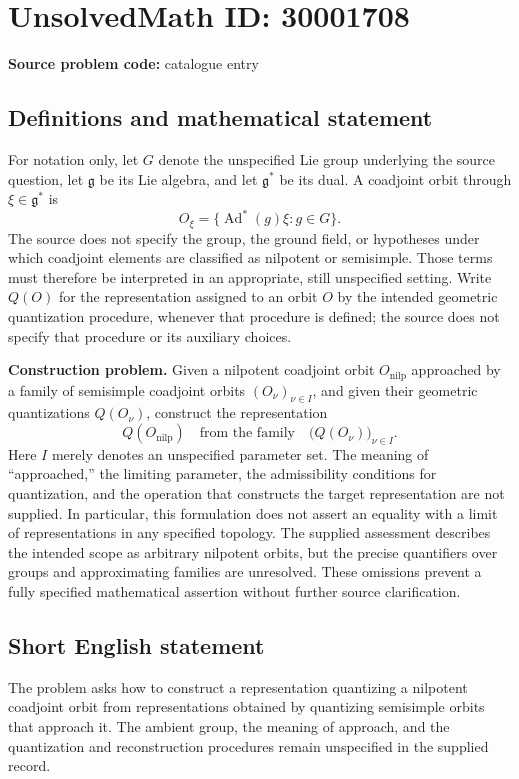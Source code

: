 \documentclass[11pt]{article}
\begin{document}
\section*{UnsolvedMath ID: 30001708}
\textbf{Source problem code:} catalogue entry
\subsection{Definitions and mathematical statement}
For notation only, let \(G\) denote the unspecified Lie group underlying the source question, let \(\mathfrak g\) be its Lie algebra, and let \(\mathfrak g^*\) be its dual. A coadjoint orbit through \(\xi\in\mathfrak g^*\) is
\[
O_\xi=\{\operatorname{Ad}^*(g)\xi:g\in G\}.
\]
The source does not specify the group, the ground field, or hypotheses under which coadjoint elements are classified as nilpotent or semisimple. Those terms must therefore be interpreted in an appropriate, still unspecified setting. Write \(Q(O)\) for the representation assigned to an orbit \(O\) by the intended geometric quantization procedure, whenever that procedure is defined; the source does not specify that procedure or its auxiliary choices.

\textbf{Construction problem.} Given a nilpotent coadjoint orbit \(O_{\mathrm{nilp}}\) approached by a family of semisimple coadjoint orbits \((O_\nu)_{\nu\in I}\), and given their geometric quantizations \(Q(O_\nu)\), construct the representation
\[
Q(O_{\mathrm{nilp}})
\quad\text{from the family}\quad
\bigl(Q(O_\nu)\bigr)_{\nu\in I}.
\]
Here \(I\) merely denotes an unspecified parameter set. The meaning of ``approached,'' the limiting parameter, the admissibility conditions for quantization, and the operation that constructs the target representation are not supplied. In particular, this formulation does not assert an equality with a limit of representations in any specified topology. The supplied assessment describes the intended scope as arbitrary nilpotent orbits, but the precise quantifiers over groups and approximating families are unresolved. These omissions prevent a fully specified mathematical assertion without further source clarification.
\subsection{Short English statement}
The problem asks how to construct a representation quantizing a nilpotent coadjoint orbit from representations obtained by quantizing semisimple orbits that approach it. The ambient group, the meaning of approach, and the quantization and reconstruction procedures remain unspecified in the supplied record.
\end{document}
